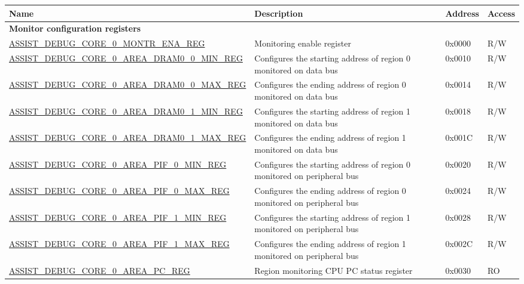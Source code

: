 \begin{longtable}{ | l| m{4cm} | l | l | }
\hline\rowcolor{lightgray}
{\bfseries Name} & {\bfseries Description} &  {\bfseries Address} & {\bfseries Access} \\ \hline
\endhead
\multicolumn{4}{|l|}{\textbf{Monitor configuration registers}} \\ \hline
\hyperref[regdesc:ASSISTDEBUGCORE0MONTRENAREG]{ASSIST\_DEBUG\_CORE\_0\_MONTR\_ENA\_REG} & Monitoring enable register & 0x0000 & R/W \\ \hline
\hyperref[regdesc:ASSISTDEBUGCORE0AREADRAM00MINREG]{ASSIST\_DEBUG\_CORE\_0\_AREA\_DRAM0\_0\_MIN\_REG} &  Configures the starting address of region 0 monitored on data bus & 0x0010 & R/W \\ \hline
\hyperref[regdesc:ASSISTDEBUGCORE0AREADRAM00MAXREG]{ASSIST\_DEBUG\_CORE\_0\_AREA\_DRAM0\_0\_MAX\_REG} &  Configures the ending address of region 0 monitored on data bus & 0x0014 & R/W \\ \hline
\hyperref[regdesc:ASSISTDEBUGCORE0AREADRAM01MINREG]{ASSIST\_DEBUG\_CORE\_0\_AREA\_DRAM0\_1\_MIN\_REG} &  Configures the starting address of region 1 monitored on data bus & 0x0018 & R/W \\ \hline
\hyperref[regdesc:ASSISTDEBUGCORE0AREADRAM01MAXREG]{ASSIST\_DEBUG\_CORE\_0\_AREA\_DRAM0\_1\_MAX\_REG} & Configures the ending address of region 1 monitored on data bus & 0x001C & R/W \\ \hline
\hyperref[regdesc:ASSISTDEBUGCORE0AREAPIF0MINREG]{ASSIST\_DEBUG\_CORE\_0\_AREA\_PIF\_0\_MIN\_REG} & Configures the starting address of region 0 monitored on peripheral bus & 0x0020 & R/W \\ \hline
\hyperref[regdesc:ASSISTDEBUGCORE0AREAPIF0MAXREG]{ASSIST\_DEBUG\_CORE\_0\_AREA\_PIF\_0\_MAX\_REG} & Configures the ending address of region 0 monitored on peripheral bus & 0x0024 & R/W \\ \hline
\hyperref[regdesc:ASSISTDEBUGCORE0AREAPIF1MINREG]{ASSIST\_DEBUG\_CORE\_0\_AREA\_PIF\_1\_MIN\_REG} & Configures the starting address of region 1 monitored on peripheral bus & 0x0028 & R/W \\ \hline
\hyperref[regdesc:ASSISTDEBUGCORE0AREAPIF1MAXREG]{ASSIST\_DEBUG\_CORE\_0\_AREA\_PIF\_1\_MAX\_REG} & Configures the ending address of region 1 monitored on peripheral bus & 0x002C & R/W \\ \hline
\hyperref[regdesc:ASSISTDEBUGCORE0AREAPCREG]{ASSIST\_DEBUG\_CORE\_0\_AREA\_PC\_REG} & Region monitoring CPU PC status register  & 0x0030 & RO \\ \hline

\end{longtable}
